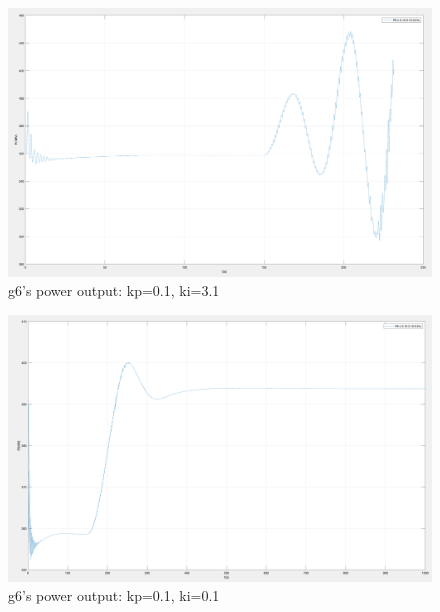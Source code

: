 \begin{figure}[!t]
\center
\includegraphics[scale=0.25]{figure/3_5_yfinal1.png}
\caption{g6's power output: kp=0.1, ki=3.1}
\label{3_5_yfinal1}
\end{figure}

\begin{figure}[!t]
\center
\includegraphics[scale=0.25]{figure/3_5_yfinal2.png}
\caption{g6's power output: kp=0.1, ki=0.1}
\label{3_5_yfinal2}
\end{figure}


